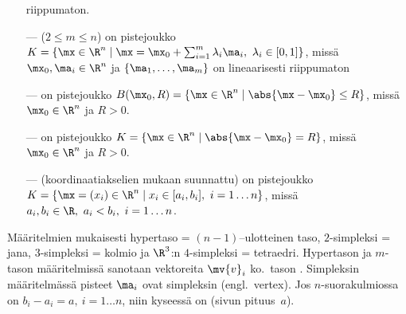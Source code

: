 \begin{itemize}
           riippumaton. 
\item[---]  ($2 \le m \le n$) on pistejoukko \\
           $K = \{\mx \in \R^n \mid \mx 
              = \mx_0+\sum_{i=1}^m \lambda_i \ma_i,\ \lambda_i \in [0,1]\}$, missä 
           $\mx_0,\ma_i\in\R^n$ ja $\{\ma_1,\ldots,\ma_m\}$ on lineaarisesti riippumaton
\item[---]  on pistejoukko 
           $B(\mx_0,R) = \{\mx \in \R^n \mid \abs{\mx-\mx_0} \le R\}$, missä \\
           $\mx_0 \in \R^n$ ja $R>0$. 
\item[---]  on pistejoukko $K = \{\mx \in \R^n \mid \abs{\mx-\mx_0} = R\}$, 
           missä \\
           $\mx_0 \in \R^n$ ja $R>0$. 
\item[---]  (koordinaatiakselien mukaan suunnattu) on pistejoukko \\
           $K = \{\mx = (x_i) \in \R^n \mid x_i \in [a_i,b_i],\ i = 1 \ldots n\}$, missä \\
           $a_i,b_i \in \R,\ a_i < b_i,\ i = 1 \ldots n$. 
\end{itemize}
Määritelmien  mukaisesti hypertaso = $(n-1)$--ulotteinen taso, $2$-simpleksi = jana, 
$3$-simpleksi = kolmio ja $\R^3$:n $4$-simpleksi = tetraedri. Hypertason ja $m$-tason 
määritelmissä sanotaan vektoreita $\mv{v}_i$ ko.\ tason
%
. Simpleksin 
%
määritelmässä pisteet $\ma_i$ ovat simpleksin  (engl.\ vertex). Jos
$n$-suorakulmiossa on $b_i-a_i = a,\ i = 1 \ldots n$, niin kyseessä on 
%
 (sivun pituus $\,a$).

